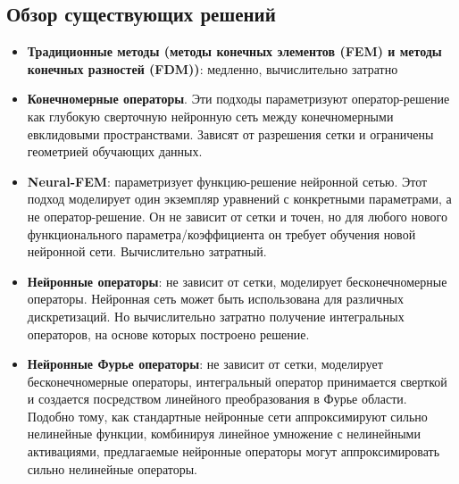 \subsection{Обзор существующих решений}
	\begin{itemize}
		\item \textbf{Традиционные методы (методы конечных элементов (FEM) и методы конечных разностей (FDM))}: медленно, вычислительно затратно
		\item \textbf{Конечномерные операторы}. Эти подходы параметризуют оператор-решение как глубокую сверточную нейронную сеть между конечномерными евклидовыми пространствами. Зависят от разрешения сетки и ограничены геометрией обучающих данных.
		\item \textbf{Neural-FEM}: параметризует функцию-решение  нейронной сетью. Этот подход моделирует один экземпляр уравнений с конкретными параметрами, а не оператор-решение. Он не зависит от сетки и точен, но для любого нового функционального параметра/коэффициента он требует обучения новой нейронной сети. Вычислительно затратный.
		\item \textbf{Нейронные операторы}: не зависит от сетки, моделирует бесконечномерные операторы. Нейронная сеть может быть использована для различных дискретизаций. Но вычислительно затратно получение интегральных операторов, на основе которых построено решение.
		\item \textbf{Нейронные Фурье операторы}: не зависит от сетки, моделирует бесконечномерные операторы, интегральный оператор принимается сверткой и создается посредством линейного преобразования в Фурье области. Подобно тому, как стандартные нейронные сети аппроксимируют сильно нелинейные функции, комбинируя линейное умножение с нелинейными активациями, предлагаемые нейронные операторы могут аппроксимировать сильно нелинейные операторы.
	\end{itemize}


